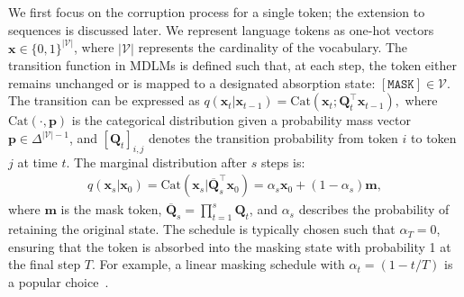 \documentclass{article}
\newcommand{\mask}{[\texttt{MASK}]\xspace}
\begin{document}
We first focus on the corruption process for a single token; the extension to sequences is discussed later.
% 
We represent language tokens as one-hot vectors $\mathbf{x} \in \{0,1\}^{|\mathcal{V}|}$, where $|\mathcal{V}|$ represents the cardinality of the vocabulary. 
% 
The transition function in MDLMs is defined such that, at each step, the token either remains unchanged or is mapped to a designated absorption state: $\mask \in \mathcal{V}$.
The transition can be expressed as 
$
    q(\mathbf{x}_t|\mathbf{x}_{t-1}) = \text{Cat}(\mathbf{x}_t; \mathbf{Q}^\top_t\mathbf{x}_{t-1}),
$
where $\text{Cat}(\cdot,\mathbf{p})$ is the categorical distribution given a probability mass vector $\mathbf{p}\in \Delta^{|\mathcal{V}|-1}$, and $[\mathbf{Q}_t]_{i,j}$ denotes the transition probability from token $i$ to token $j$ at time $t$.
% 
The marginal distribution after $s$ steps is: 
\begin{align*}
    q(\mathbf{x}_{s}| \mathbf{x}_0) = \text{Cat}(\mathbf{x}_s| \overline{\mathbf{Q}}^\top_s \mathbf{x}_0 ) = \alpha_s \mathbf{x}_0 + (1-\alpha_s) \mathbf{m},  
\end{align*}
where $\mathbf{m}$ is the mask token, $\overline{\mathbf{Q}}_s = \prod_{t=1}^s \mathbf{Q}_t$, and $\alpha_s$ describes the probability of retaining the original state. 
%
The schedule is typically chosen such that $\alpha_T = 0$, ensuring that the token is absorbed into the masking state with probability 1 at the final step $T$.
% 
For example, a linear masking schedule with $\alpha_t =(1-t/T)$ is a popular choice~\citep{austin_structured_2021, gong_scaling_2025, nie_large_2025}. 
\end{document}
